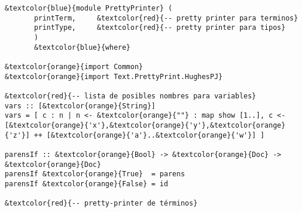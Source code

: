 \documentclass[12pt, a4paper]{article}
\begin{document}
\begin{Verbatim}[commandchars=\&\{\}]
&textcolor{blue}{module PrettyPrinter} (
       printTerm,     &textcolor{red}{-- pretty printer para terminos}
       printType,     &textcolor{red}{-- pretty printer para tipos}
       )
       &textcolor{blue}{where}

&textcolor{orange}{import Common}
&textcolor{orange}{import Text.PrettyPrint.HughesPJ}

&textcolor{red}{-- lista de posibles nombres para variables}
vars :: [&textcolor{orange}{String}]
vars = [ c : n | n <- &textcolor{orange}{""} : map show [1..], c <- [&textcolor{orange}{'x'},&textcolor{orange}{'y'},&textcolor{orange}{'z'}] ++ [&textcolor{orange}{'a'}..&textcolor{orange}{'w'}] ]
              
parensIf :: &textcolor{orange}{Bool} -> &textcolor{orange}{Doc} -> &textcolor{orange}{Doc}
parensIf &textcolor{orange}{True}  = parens
parensIf &textcolor{orange}{False} = id

&textcolor{red}{-- pretty-printer de términos}


\end{Verbatim}
\end{document}
